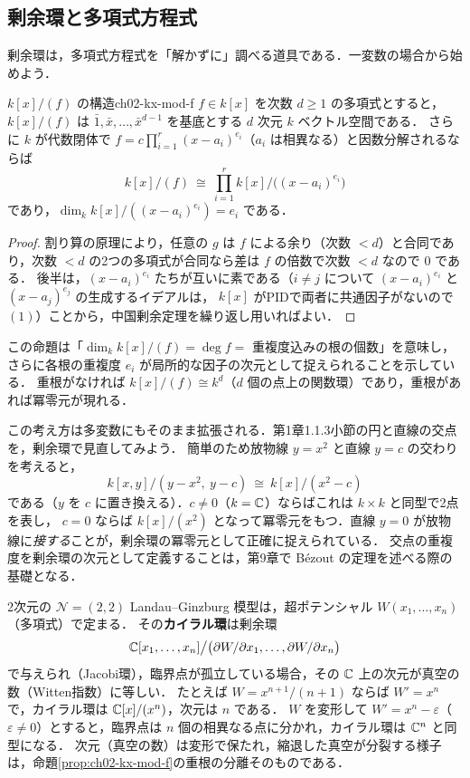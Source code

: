 \subsection{剰余環と多項式方程式}

剰余環は，多項式方程式を「解かずに」調べる道具である．一変数の場合から始めよう．

\begin{myprop}{$k[x]/(f)$ の構造}{ch02-kx-mod-f}
$f\in k[x]$ を次数 $d\ge1$ の多項式とすると，$k[x]/(f)$ は $\bar1,\bar x,\dots,\bar x^{d-1}$ を基底とする $d$ 次元 $k$ ベクトル空間である．
さらに $k$ が代数閉体で $f=c\prod_{i=1}^r(x-a_i)^{e_i}$（$a_i$ は相異なる）と因数分解されるならば
\[
  k[x]/(f)\ \cong\ \prod_{i=1}^rk[x]/\big((x-a_i)^{e_i}\big)
\]
であり，$\dim_kk[x]/((x-a_i)^{e_i})=e_i$ である．
\end{myprop}

\begin{proof}
割り算の原理により，任意の $g$ は $f$ による余り（次数 $<d$）と合同であり，次数 $<d$ の2つの多項式が合同なら差は $f$ の倍数で次数 $<d$ なので $0$ である．
後半は，$(x-a_i)^{e_i}$ たちが互いに素である（$i\ne j$ について $(x-a_i)^{e_i}$ と $(x-a_j)^{e_j}$ の生成するイデアルは，
$k[x]$ がPIDで両者に共通因子がないので $(1)$）ことから，中国剰余定理を繰り返し用いればよい．
\end{proof}

この命題は「$\dim_kk[x]/(f)=\deg f=$ 重複度込みの根の個数」を意味し，さらに各根の重複度 $e_i$ が局所的な因子の次元として捉えられることを示している．
重根がなければ $k[x]/(f)\cong k^d$（$d$ 個の点上の関数環）であり，重根があれば冪零元が現れる．

この考え方は多変数にもそのまま拡張される．第1章1.1.3小節の円と直線の交点を，剰余環で見直してみよう．
簡単のため放物線 $y=x^2$ と直線 $y=c$ の交わりを考えると，
\[
  k[x,y]/(y-x^2,\ y-c)\ \cong\ k[x]/(x^2-c)
\]
である（$y$ を $c$ に置き換える）．$c\ne0$（$k=\mathbb{C}$）ならばこれは $k\times k$ と同型で2点を表し，
$c=0$ ならば $k[x]/(x^2)$ となって冪零元をもつ．直線 $y=0$ が放物線に\emph{接する}ことが，剰余環の冪零元として正確に捉えられている．
交点の重複度を剰余環の次元として定義することは，第9章で Bézout の定理を述べる際の基礎となる．

\begin{physbox}[カイラル環とWitten指数]
2次元の $\mathcal N=(2,2)$ Landau--Ginzburg 模型は，超ポテンシャル $W(x_1,\dots,x_n)$（多項式）で定まる．
その\textbf{カイラル環}は剰余環
\[
  \mathbb{C}[x_1,\dots,x_n]\big/\big(\partial W/\partial x_1,\dots,\partial W/\partial x_n\big)
\]
で与えられ（Jacobi環），臨界点が孤立している場合，その $\mathbb{C}$ 上の次元が真空の数（Witten指数）に等しい．
たとえば $W=x^{n+1}/(n+1)$ ならば $W'=x^n$ で，カイラル環は $\mathbb{C}[x]/(x^n)$，次元は $n$ である．
$W$ を変形して $W'=x^n-\varepsilon$（$\varepsilon\ne0$）とすると，臨界点は $n$ 個の相異なる点に分かれ，カイラル環は $\mathbb{C}^n$ と同型になる．
次元（真空の数）は変形で保たれ，縮退した真空が分裂する様子は，命題\ref{prop:ch02-kx-mod-f}の重根の分離そのものである．
\end{physbox}


